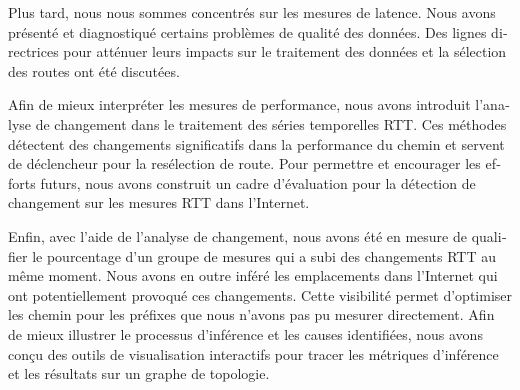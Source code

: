 \begin{otherlanguage}{french}
Plus tard, nous nous sommes concentrés sur les mesures de latence.
Nous avons présenté et diagnostiqué certains problèmes de qualité des données.
Des lignes directrices pour atténuer leurs impacts sur le traitement des données et la sélection des routes ont été discutées.

Afin de mieux interpréter les mesures de performance, nous avons introduit l'analyse de changement dans le traitement des séries temporelles RTT.
Ces méthodes détectent des changements significatifs dans la performance du chemin et servent de déclencheur pour la resélection de route.
Pour permettre et encourager les efforts futurs, nous avons construit un cadre d'évaluation pour la détection de changement sur les mesures RTT dans l'Internet.

Enfin, avec l'aide de l'analyse de changement, nous avons été en mesure de qualifier le pourcentage d'un groupe de mesures qui a subi des changements RTT au même moment.
Nous avons en outre inféré les emplacements dans l'Internet qui ont potentiellement provoqué ces changements.
Cette visibilité permet d'optimiser les chemin pour les préfixes que nous n'avons pas pu mesurer directement.
Afin de mieux illustrer le processus d'inférence et les causes identifiées, 
nous avons conçu des outils de visualisation interactifs pour tracer les métriques d'inférence et les résultats sur un graphe de topologie.

\vfill

\end{otherlanguage}
\endgroup			

